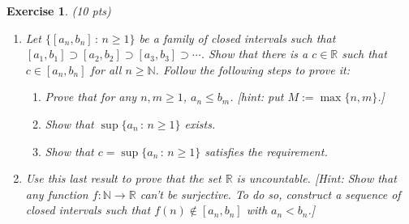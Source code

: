 \documentclass[12pt]{article}
\newcommand{\bR}{\mathbb{R}}
\newcommand{\bN}{\mathbb{N}}
\newcommand{\ra}{\rightarrow}
\theoremstyle{plain}
\newtheorem{exer}{\textbf{Exercise}}}
\theoremstyle{plain}
\theoremstyle{plain}
\theoremstyle{plain}
\begin{document}
\begin{exer}
(10 pts)
\begin{enumerate}[label=\textbf{\alph*)}]
\item Let $\{ [a_n , b_n ] \, : \, n \geq 1\}$ be a family of closed intervals such that $[a_1 , b_1] \supset [a_2 , b_2] \supset [a_3, b_3] \supset \cdots$. Show that there is a $c \in \bR$ such that $c \in [a_n , b_n ]$ for all $n \geq \bN$. Follow the following steps to prove it:
	\begin{enumerate}[label=\textbf{(\roman*)}]
	\item Prove that for any $n, m \geq 1$, $a_n \leq b_m$. [hint: put $M := \max \{ n , m \}$.]
	\item Show that $\sup \{ a_n\, : \, n \geq 1 \}$ exists.
	\item Show that $c = \sup \{ a_n \, : \, n \geq 1\}$ satisfies the requirement.	
	\end{enumerate}
\item Use this last result to prove that the set $\bR$ is uncountable. [Hint: Show that any function $f : \bN \ra \bR$ can't be surjective. To do so, construct a sequence of closed intervals such that $f(n) \not\in [a_n , b_n]$ with $a_n < b_n$.]
\end{enumerate}
\end{exer}
\end{document}

